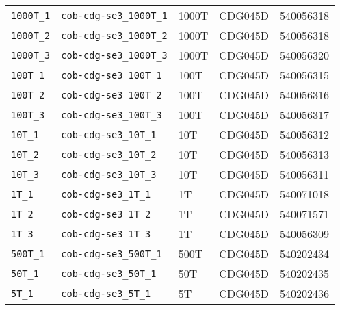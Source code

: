 \begin{tabular}{ l l l l l }
\verb|1000T_1|&\verb|cob-cdg-se3_1000T_1|&1000T&CDG045D&540056318\\
\verb|1000T_2|&\verb|cob-cdg-se3_1000T_2|&1000T&CDG045D&540056318\\
\verb|1000T_3|&\verb|cob-cdg-se3_1000T_3|&1000T&CDG045D&540056320\\
\verb|100T_1|&\verb|cob-cdg-se3_100T_1|&100T&CDG045D&540056315\\
\verb|100T_2|&\verb|cob-cdg-se3_100T_2|&100T&CDG045D&540056316\\
\verb|100T_3|&\verb|cob-cdg-se3_100T_3|&100T&CDG045D&540056317\\
\verb|10T_1|&\verb|cob-cdg-se3_10T_1|&10T&CDG045D&540056312\\
\verb|10T_2|&\verb|cob-cdg-se3_10T_2|&10T&CDG045D&540056313\\
\verb|10T_3|&\verb|cob-cdg-se3_10T_3|&10T&CDG045D&540056311\\
\verb|1T_1|&\verb|cob-cdg-se3_1T_1|&1T&CDG045D&540071018\\
\verb|1T_2|&\verb|cob-cdg-se3_1T_2|&1T&CDG045D&540071571\\
\verb|1T_3|&\verb|cob-cdg-se3_1T_3|&1T&CDG045D&540056309\\
\verb|500T_1|&\verb|cob-cdg-se3_500T_1|&500T&CDG045D&540202434\\
\verb|50T_1|&\verb|cob-cdg-se3_50T_1|&50T&CDG045D&540202435\\
\verb|5T_1|&\verb|cob-cdg-se3_5T_1|&5T&CDG045D&540202436\\
\end{tabular}
